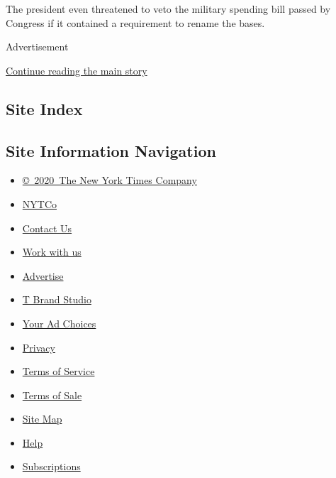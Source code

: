 The president even threatened to veto the military spending bill passed
by Congress if it contained a requirement to rename the bases.

Advertisement

\protect\hyperlink{after-bottom}{Continue reading the main story}

\hypertarget{site-index}{%
\subsection{Site Index}\label{site-index}}

\hypertarget{site-information-navigation}{%
\subsection{Site Information
Navigation}\label{site-information-navigation}}

\begin{itemize}
\tightlist
\item
  \href{https://help.nytimes.com/hc/en-us/articles/115014792127-Copyright-notice}{©~2020~The
  New York Times Company}
\end{itemize}

\begin{itemize}
\tightlist
\item
  \href{https://www.nytco.com/}{NYTCo}
\item
  \href{https://help.nytimes.com/hc/en-us/articles/115015385887-Contact-Us}{Contact
  Us}
\item
  \href{https://www.nytco.com/careers/}{Work with us}
\item
  \href{https://nytmediakit.com/}{Advertise}
\item
  \href{http://www.tbrandstudio.com/}{T Brand Studio}
\item
  \href{https://www.nytimes.com/privacy/cookie-policy\#how-do-i-manage-trackers}{Your
  Ad Choices}
\item
  \href{https://www.nytimes.com/privacy}{Privacy}
\item
  \href{https://help.nytimes.com/hc/en-us/articles/115014893428-Terms-of-service}{Terms
  of Service}
\item
  \href{https://help.nytimes.com/hc/en-us/articles/115014893968-Terms-of-sale}{Terms
  of Sale}
\item
  \href{https://spiderbites.nytimes.com}{Site Map}
\item
  \href{https://help.nytimes.com/hc/en-us}{Help}
\item
  \href{https://www.nytimes.com/subscription?campaignId=37WXW}{Subscriptions}
\end{itemize}
